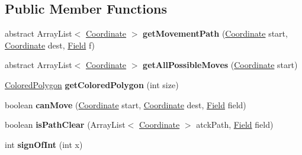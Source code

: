 \subsection*{Public Member Functions}
\begin{DoxyCompactItemize}
\item 
\mbox{\label{class_source_files_1_1_piece_a9202b7ac4e29e14713178189ede3e3bb}} 
abstract Array\+List$<$ \mbox{\hyperlink{class_source_files_1_1_coordinate}{Coordinate}} $>$ {\bfseries get\+Movement\+Path} (\mbox{\hyperlink{class_source_files_1_1_coordinate}{Coordinate}} start, \mbox{\hyperlink{class_source_files_1_1_coordinate}{Coordinate}} dest, \mbox{\hyperlink{class_source_files_1_1_field}{Field}} f)
\item 
\mbox{\label{class_source_files_1_1_piece_a3d4023342377075e32823252d4177813}} 
abstract Array\+List$<$ \mbox{\hyperlink{class_source_files_1_1_coordinate}{Coordinate}} $>$ {\bfseries get\+All\+Possible\+Moves} (\mbox{\hyperlink{class_source_files_1_1_coordinate}{Coordinate}} start)
\item 
\mbox{\label{class_source_files_1_1_piece_a2b70c2f3bff883dca506fb3380c1e0b0}} 
\mbox{\hyperlink{class_g_u_i_1_1_colored_polygon}{Colored\+Polygon}} {\bfseries get\+Colored\+Polygon} (int size)
\item 
\mbox{\label{class_source_files_1_1_piece_ad78c3c615a21583d0c3864676a7effe1}} 
boolean {\bfseries can\+Move} (\mbox{\hyperlink{class_source_files_1_1_coordinate}{Coordinate}} start, \mbox{\hyperlink{class_source_files_1_1_coordinate}{Coordinate}} dest, \mbox{\hyperlink{class_source_files_1_1_field}{Field}} field)
\item 
\mbox{\label{class_source_files_1_1_piece_af32e028a8380a2510f53640fdd21f8e1}} 
boolean {\bfseries is\+Path\+Clear} (Array\+List$<$ \mbox{\hyperlink{class_source_files_1_1_coordinate}{Coordinate}} $>$ atck\+Path, \mbox{\hyperlink{class_source_files_1_1_field}{Field}} field)
\item 
\mbox{\label{class_source_files_1_1_piece_a169f789ef974ed5a26d2243cae68ded2}} 
int {\bfseries sign\+Of\+Int} (int x)
\end{DoxyCompactItemize}
